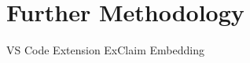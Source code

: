 \chapter{Further Methodology} %


\begin{todolist}
    \todoitem VS Code Extension
    \todoitem ExClaim Embedding
\end{todolist}


